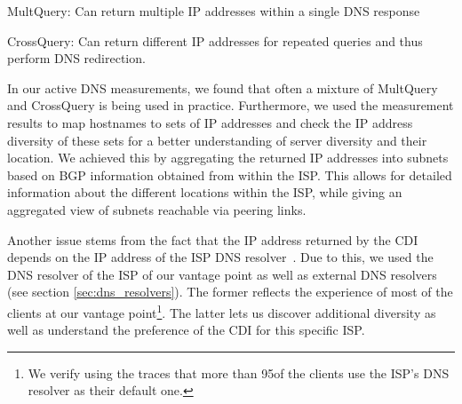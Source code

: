 \begin{description*}
\item[MultQuery:] Can return multiple IP addresses within a single DNS response
\item[CrossQuery:] Can return different IP addresses for repeated queries and
  thus perform DNS redirection.
\end{description*}

In our active DNS measurements, we found that often a mixture of MultQuery and
CrossQuery is being used in practice. Furthermore, we used the measurement
results to \first map hostnames to sets of IP addresses and \second check the
IP address diversity of these sets for a better understanding of server
diversity and their location. We achieved this by aggregating the returned IP
addresses into subnets based on BGP information obtained from within the
ISP. This allows for detailed information about the different locations within
the ISP, while giving an aggregated view of subnets reachable via peering
links.

Another issue stems from the fact that the IP address returned by the CDI
depends on the IP address of the ISP DNS
resolver~\cite{DNS-IMC-2010,dns-redirection,DraftingAkamai:SIGCOMM2006}. Due to
this, we used the DNS resolver of the ISP of our vantage point as well as
external DNS resolvers (see section \ref{sec:dns_resolvers}). The former
reflects the experience of most of the clients at our vantage point\footnote{We
verify using the traces that more than 95\perc of the clients use the ISP's DNS
resolver as their default one. }. The latter lets us discover additional
diversity as well as understand the preference of the CDI for this specific
ISP.

